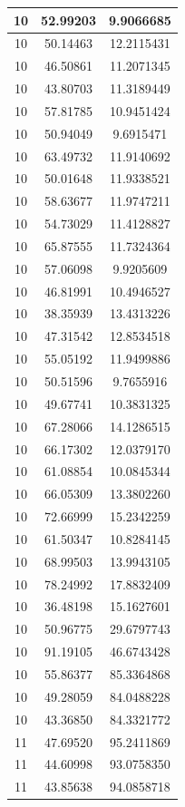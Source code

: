 \documentclass[
]{book}
\begin{document}
\begin{tabular}{c|c|c}
\hline
10 & 52.99203 & 9.9066685\\
\hline
10 & 50.14463 & 12.2115431\\
\hline
10 & 46.50861 & 11.2071345\\
\hline
10 & 43.80703 & 11.3189449\\
\hline
10 & 57.81785 & 10.9451424\\
\hline
10 & 50.94049 & 9.6915471\\
\hline
10 & 63.49732 & 11.9140692\\
\hline
10 & 50.01648 & 11.9338521\\
\hline
10 & 58.63677 & 11.9747211\\
\hline
10 & 54.73029 & 11.4128827\\
\hline
10 & 65.87555 & 11.7324364\\
\hline
10 & 57.06098 & 9.9205609\\
\hline
10 & 46.81991 & 10.4946527\\
\hline
10 & 38.35939 & 13.4313226\\
\hline
10 & 47.31542 & 12.8534518\\
\hline
10 & 55.05192 & 11.9499886\\
\hline
10 & 50.51596 & 9.7655916\\
\hline
10 & 49.67741 & 10.3831325\\
\hline
10 & 67.28066 & 14.1286515\\
\hline
10 & 66.17302 & 12.0379170\\
\hline
10 & 61.08854 & 10.0845344\\
\hline
10 & 66.05309 & 13.3802260\\
\hline
10 & 72.66999 & 15.2342259\\
\hline
10 & 61.50347 & 10.8284145\\
\hline
10 & 68.99503 & 13.9943105\\
\hline
10 & 78.24992 & 17.8832409\\
\hline
10 & 36.48198 & 15.1627601\\
\hline
10 & 50.96775 & 29.6797743\\
\hline
10 & 91.19105 & 46.6743428\\
\hline
10 & 55.86377 & 85.3364868\\
\hline
10 & 49.28059 & 84.0488228\\
\hline
10 & 43.36850 & 84.3321772\\
\hline
11 & 47.69520 & 95.2411869\\
\hline
11 & 44.60998 & 93.0758350\\
\hline
11 & 43.85638 & 94.0858718\\

\end{tabular}
\end{document}
